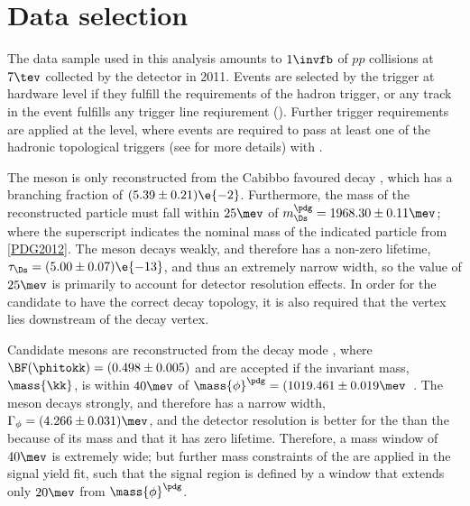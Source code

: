 \section{Data selection}
\label{sec:dsphi:sel}

%
%
%
%
%
%


The data sample used in this analysis amounts to
$1\invfb$ of $pp$ collisions at $7\tev$ collected by the \lhcb detector in 2011.
Events are selected by the trigger at hardware level if they fulfill the requirements of the \lone
hadron trigger, or any track in the event fulfills any \lone trigger line reqiurement (\tis).
Further trigger requirements are applied at the \hlttwo level, where events are required to pass at
least one of the hadronic topological triggers (see  for more details) with
\tos.

The \Ds meson is only reconstructed from the Cabibbo favoured decay \dstokkpi,
which has a branching fraction of $(5.39\pm0.21)\e{-2}$.
Furthermore, the mass of the reconstructed particle must fall within $25\mev$ of
$m_{\Ds}^\pdg=1968.30\pm0.11\mev$; where the superscript \pdg indicates the nominal mass of the
indicated particle from \ref{PDG2012}.
The \Ds meson decays weakly, and therefore has a non-zero lifetime,
$\tau_{\Ds}=(5.00\pm0.07)\e{-13}$, and thus an extremely narrow width, so the value of $25\mev$
is primarily to account for detector resolution effects.
In order for the candidate to have the correct decay topology, it is also required that the \Ds
vertex lies downstream of the \Bp decay vertex.

Candidate \phii mesons are reconstructed from the decay mode \phitokk, where
$\BF(\phitokk)=(0.498\pm0.005)$ and are accepted if the
invariant \kk mass, $\mass{\kk}$, is within $40\mev$ of
$\mass{\phi}^\pdg=(1019.461\pm0.019\mev$~\cite{PDG2012}.
The \phii meson decays strongly, and therefore has a narrow width,
$\Gamma_\phi=(4.266\pm0.031)\mev$, and the detector resolution is better for the \phii than the \Ds
because of its mass and that it has zero lifetime.
Therefore, a mass window of $40\mev$ is extremely wide; but further mass constraints of the \phii
are applied in the signal yield fit, such that the signal region is defined by a window that
extends only $20\mev$ from $\mass{\phi}^\pdg$.

